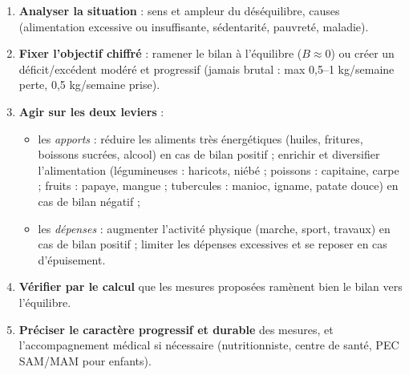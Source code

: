 \documentclass[11pt]{article}
\begin{document}
\begin{methode}
\begin{enumerate}
\item \textbf{Analyser la situation} : sens et ampleur du déséquilibre, causes (alimentation excessive ou insuffisante, sédentarité, pauvreté, maladie).
\item \textbf{Fixer l'objectif chiffré} : ramener le bilan à l'équilibre ($B \approx 0$) ou créer un déficit/excédent modéré et progressif (jamais brutal : max 0,5--1 kg/semaine perte, 0,5 kg/semaine prise).
\item \textbf{Agir sur les deux leviers} :
\begin{itemize}
\item les \emph{apports} : réduire les aliments très énergétiques (huiles, fritures, boissons sucrées, alcool) en cas de bilan positif ; enrichir et diversifier l'alimentation (légumineuses : haricots, niébé ; poissons : capitaine, carpe ; fruits : papaye, mangue ; tubercules : manioc, igname, patate douce) en cas de bilan négatif ;
\item les \emph{dépenses} : augmenter l'activité physique (marche, sport, travaux) en cas de bilan positif ; limiter les dépenses excessives et se reposer en cas d'épuisement.
\end{itemize}
\item \textbf{Vérifier par le calcul} que les mesures proposées ramènent bien le bilan vers l'équilibre.
\item \textbf{Préciser le caractère progressif et durable} des mesures, et l'accompagnement médical si nécessaire (nutritionniste, centre de santé, PEC SAM/MAM pour enfants).
\end{enumerate}
\end{methode}
\end{document}
